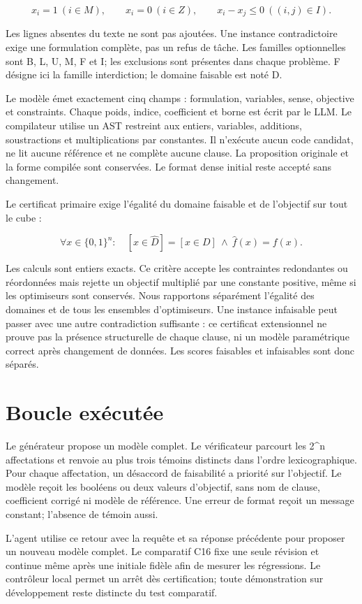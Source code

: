 \documentclass[11pt]{article}
\begin{document}
\[x_i=1\ (i\in M),\qquad x_i=0\ (i\in Z),\qquad x_i-x_j\leq0\ ((i,j)\in I).\]

Les lignes absentes du texte ne sont pas ajoutées. Une instance contradictoire exige une formulation complète, pas un refus de tâche. Les familles optionnelles sont B, L, U, M, F et I; les exclusions sont présentes dans chaque problème. F désigne ici la famille interdiction; le domaine faisable est noté D.

Le modèle émet exactement cinq champs : formulation, variables, sense, objective et constraints. Chaque poids, indice, coefficient et borne est écrit par le LLM. Le compilateur utilise un AST restreint aux entiers, variables, additions, soustractions et multiplications par constantes. Il n'exécute aucun code candidat, ne lit aucune référence et ne complète aucune clause. La proposition originale et la forme compilée sont conservées. Le format dense initial reste accepté sans changement.

Le certificat primaire exige l'égalité du domaine faisable et de l'objectif sur tout le cube :

\[\forall x\in\{0,1\}^n:\quad [x\in\widehat D]=[x\in D]\ \land\ \widehat f(x)=f(x).\]

Les calculs sont entiers exacts. Ce critère accepte les contraintes redondantes ou réordonnées mais rejette un objectif multiplié par une constante positive, même si les optimiseurs sont conservés. Nous rapportons séparément l'égalité des domaines et de tous les ensembles d'optimiseurs. Une instance infaisable peut passer avec une autre contradiction suffisante : ce certificat extensionnel ne prouve pas la présence structurelle de chaque clause, ni un modèle paramétrique correct après changement de données. Les scores faisables et infaisables sont donc séparés.

\section{Boucle exécutée}

Le générateur propose un modèle complet. Le vérificateur parcourt les 2\textasciicircum{}n affectations et renvoie au plus trois témoins distincts dans l'ordre lexicographique. Pour chaque affectation, un désaccord de faisabilité a priorité sur l'objectif. Le modèle reçoit les booléens ou deux valeurs d'objectif, sans nom de clause, coefficient corrigé ni modèle de référence. Une erreur de format reçoit un message constant; l'absence de témoin aussi.

L'agent utilise ce retour avec la requête et sa réponse précédente pour proposer un nouveau modèle complet. Le comparatif C16 fixe une seule révision et continue même après une initiale fidèle afin de mesurer les régressions. Le contrôleur local permet un arrêt dès certification; toute démonstration sur développement reste distincte du test comparatif.
\end{document}
